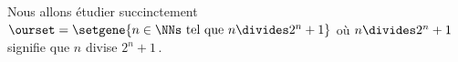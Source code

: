 Nous allons étudier succinctement
$\ourset = \setgene{n \in \NNs \text{ tel que } n \divides 2^n + 1}$
où $n \divides 2^n + 1$ signifie que $n$ divise $2^n + 1$\,.
